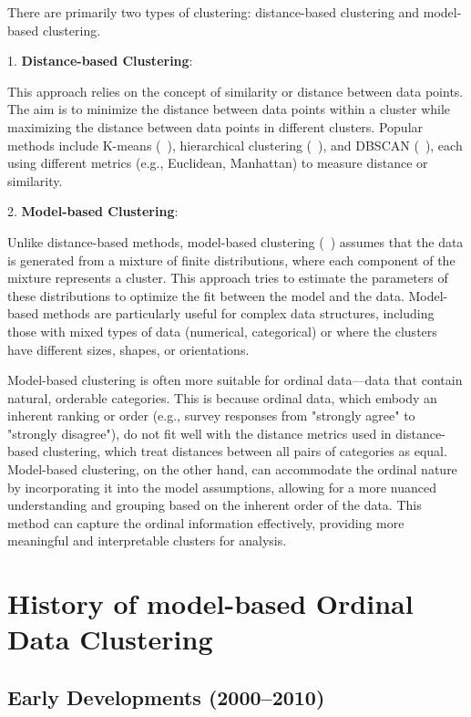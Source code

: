 \documentclass{article}
\begin{document}
There are primarily two types of clustering: distance-based clustering and model-based clustering.

1. \textbf{Distance-based Clustering}: 

This approach relies on the concept of similarity or distance between data points. 
The aim is to minimize the distance between data points within a cluster while maximizing the distance between data points in different clusters. 
Popular methods include K-means (~\cite{macqueen1967some}), 
hierarchical clustering (~\cite{johnson1967hierarchical}), and DBSCAN (~\cite{ester1996density}), 
each using different metrics (e.g., Euclidean, Manhattan) to measure distance or similarity.

2. \textbf{Model-based Clustering}: 

Unlike distance-based methods, model-based clustering (~\cite{fraley2002model}) assumes that the data is generated from a mixture of finite distributions, 
where each component of the mixture represents a cluster. 
This approach tries to estimate the parameters of these distributions to optimize the fit between the model and the data. 
Model-based methods are particularly useful for complex data structures, including those with mixed types of data (numerical, categorical) or where the clusters have different sizes, shapes, or orientations.

Model-based clustering is often more suitable for ordinal data—data that contain natural, orderable categories. This is because ordinal data, which embody an inherent ranking or order (e.g., survey responses from "strongly agree" to "strongly disagree"), do not fit well with the distance metrics used in distance-based clustering, which treat distances between all pairs of categories as equal. Model-based clustering, on the other hand, can accommodate the ordinal nature by incorporating it into the model assumptions, allowing for a more nuanced understanding and grouping based on the inherent order of the data. This method can capture the ordinal information effectively, providing more meaningful and interpretable clusters for analysis.

\section{History of model-based Ordinal Data Clustering}

\subsection{Early Developments (2000--2010)}
\end{document}
